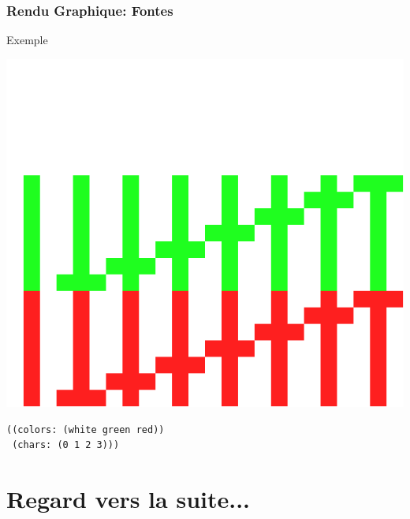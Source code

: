 \documentclass{beamer}
\newcommand{\<}[1]{\`#1}
\begin{document}
\begin{frame}[fragile]
  \frametitle{Rendu Graphique: Fontes}

  \begin{block}{Exemple}
    \begin{center}
      \includegraphics[scale=0.2]{font-exemple}
    \end{center}
    \begin{lstlisting}[basicstyle=\footnotesize]
((colors: (white green red))
 (chars: (0 1 2 3)))
    \end{lstlisting}
  \end{block}
\end{frame}



\section{Regard vers la suite...}
\end{document}
